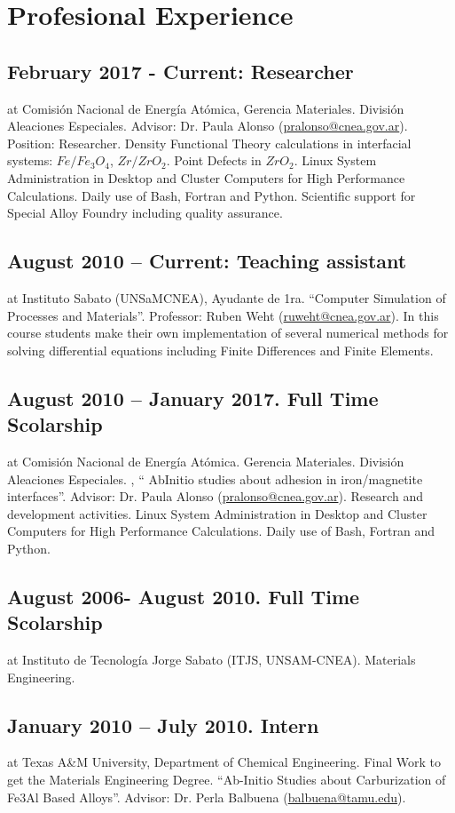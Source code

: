 \section{Profesional Experience}

\subsection{February 2017 - Current: Researcher} at Comisión Nacional de Energía Atómica,  Gerencia Materiales. División Aleaciones Especiales. \textbf{} Advisor: Dr. Paula Alonso (\url{pralonso@cnea.gov.ar}). Position: Researcher. Density Functional Theory calculations in interfacial systems: $Fe / Fe_3O_4$, $Zr/ZrO_2$. Point Defects in $ZrO_2$. Linux System Administration in Desktop and Cluster Computers for High Performance Calculations. Daily use of Bash, Fortran and Python. Scientific support for Special Alloy Foundry including quality assurance.

\subsection{August 2010 – Current: Teaching assistant} at Instituto Sabato (UNSaM\-CNEA), Ayudante de 1ra. “Computer Simulation of Processes and Materials”. Professor: Ruben Weht (\url{ruweht@cnea.gov.ar}). In this course students make their own implementation of several numerical methods for solving differential equations including Finite Differences and Finite Elements.

\subsection{August 2010 – January 2017. Full Time Scolarship} at Comisión Nacional de Energía Atómica. Gerencia Materiales. División Aleaciones Especiales. , “ Ab\-Initio studies about adhesion in iron/magnetite interfaces”. Advisor: Dr. Paula Alonso (\url{pralonso@cnea.gov.ar}). Research and development activities. Linux System Administration in Desktop and Cluster Computers for High Performance Calculations. Daily use of Bash, Fortran and Python. 

\subsection{August 2006- August 2010. Full Time Scolarship } at Instituto de Tecnología Jorge Sabato (ITJS, UNSAM-CNEA). Materials Engineering. 

\subsection{January 2010 – July 2010. Intern } at Texas A\&M University, Department of Chemical Engineering. Final Work to get the Materials Engineering Degree. “Ab-Initio Studies about Carburization of Fe3Al Based Alloys”. Advisor: Dr. Perla Balbuena (\url{balbuena@tamu.edu}). 

